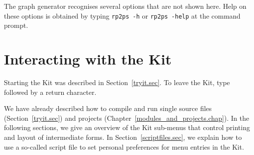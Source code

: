 \documentclass[12pt]{book}
\begin{document}
The graph generator recognises several options that are not shown
here. Help on these options is obtained by typing \texttt{rp2ps -h} or
%
{\tt rp2ps -help} at the command prompt.
%

\chapter{Interacting with the Kit}
\label{controlkit.sec}
\label{startup.sec}

Starting the Kit was described in Section~\ref{tryit.sec}.  To
%
%
%
leave the Kit, type  followed by a
return character. 

We have already described how to compile and run single source files
(Section~\ref{tryit.sec}) and projects
(Chapter~\ref{modules_and_projects.chap}).  In the following sections,
we give an overview of the Kit sub-menus that control printing and
layout of intermediate forms. In Section~\ref{scriptfiles.sec}, we
explain how to use a so-called script file to set personal preferences
for menu entries in the Kit.



\end{document}
